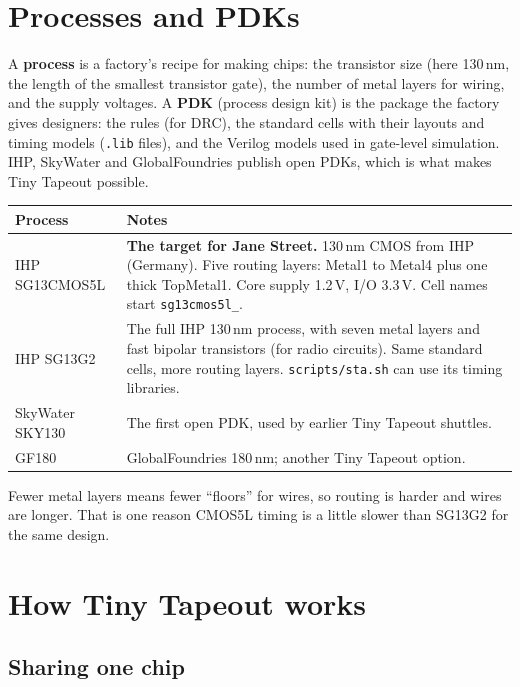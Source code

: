\documentclass[11pt,a4paper]{article}
\newcommand{\file}[1]{\texttt{#1}}
\begin{document}
\section{Processes and PDKs}

A \textbf{process} is a factory's recipe for making chips: the transistor size (here 130\,nm, the length of the smallest transistor gate), the number of metal layers for wiring, and the supply voltages. A \textbf{PDK} (process design kit) is the package the factory gives designers: the rules (for DRC), the standard cells with their layouts and timing models (\file{.lib} files), and the Verilog models used in gate-level simulation. IHP, SkyWater and GlobalFoundries publish open PDKs, which is what makes Tiny Tapeout possible.

\begin{center}
\begin{tabularx}{\linewidth}{@{}lL@{}}
\toprule
Process & Notes \\
\midrule
IHP SG13CMOS5L & \textbf{The target for Jane Street.} 130\,nm CMOS from IHP (Germany). Five routing layers: Metal1 to Metal4 plus one thick TopMetal1. Core supply 1.2\,V, I/O 3.3\,V. Cell names start \texttt{sg13cmos5l\_}. \\
IHP SG13G2 & The full IHP 130\,nm process, with seven metal layers and fast bipolar transistors (for radio circuits). Same standard cells, more routing layers. \file{scripts/sta.sh} can use its timing libraries. \\
SkyWater SKY130 & The first open PDK, used by earlier Tiny Tapeout shuttles. \\
GF180 & GlobalFoundries 180\,nm; another Tiny Tapeout option. \\
\bottomrule
\end{tabularx}
\end{center}

Fewer metal layers means fewer ``floors'' for wires, so routing is harder and wires are longer. That is one reason CMOS5L timing is a little slower than SG13G2 for the same design.

\section{How Tiny Tapeout works}

\subsection{Sharing one chip}
\end{document}
